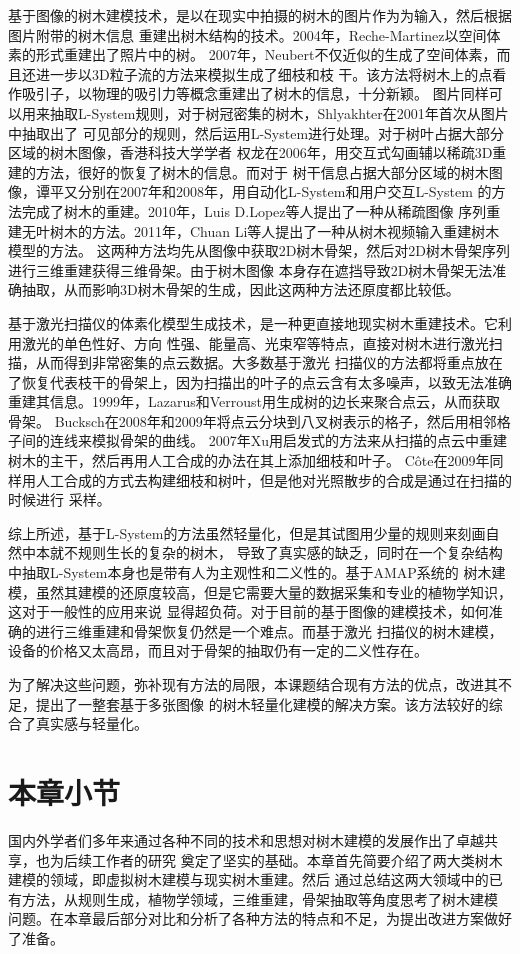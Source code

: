 基于图像的树木建模技术，是以在现实中拍摄的树木的图片作为为输入，然后根据图片附带的树木信息
重建出树木结构的技术。2004年，Reche-Martinez以空间体素的形式重建出了照片中的树\cite{reche}。
2007年，Neubert不仅近似的生成了空间体素，而且还进一步以3D粒子流的方法来模拟生成了细枝和枝
干\cite{neubert}。该方法将树木上的点看作吸引子，以物理的吸引力等概念重建出了树木的信息，十分新颖。
图片同样可以用来抽取L-System规则，对于树冠密集的树木，Shlyakhter在2001年首次从图片中抽取出了
可见部分的规则，然后运用L-System进行处理。对于树叶占据大部分区域的树木图像，香港科技大学学者
权龙在2006年，用交互式勾画辅以稀疏3D重建的方法，很好的恢复了树木的信息\cite{quanlong}。而对于
树干信息占据大部分区域的树木图像，谭平又分别在2007年和2008年，用自动化L-System和用户交互L-System
的方法完成了树木的重建\cite{tanping,tanping2}。2010年，Luis D.Lopez等人提出了一种从稀疏图像
序列重建无叶树木的方法。2011年，Chuan Li等人提出了一种从树木视频输入重建树木模型的方法\cite{lichuan}。
这两种方法均先从图像中获取2D树木骨架，然后对2D树木骨架序列进行三维重建获得三维骨架。由于树木图像
本身存在遮挡导致2D树木骨架无法准确抽取，从而影响3D树木骨架的生成，因此这两种方法还原度都比较低。

基于激光扫描仪的体素化模型生成技术，是一种更直接地现实树木重建技术。它利用激光的单色性好、方向
性强、能量高、光束窄等特点，直接对树木进行激光扫描，从而得到非常密集的点云数据。大多数基于激光
扫描仪的方法都将重点放在了恢复代表枝干的骨架上，因为扫描出的叶子的点云含有太多噪声，以致无法准确
重建其信息。1999年，Lazarus和Verroust用生成树的边长来聚合点云，从而获取骨架\cite{verroust}。
Bucksch在2008年和2009年将点云分块到八叉树表示的格子，然后用相邻格子间的连线来模拟骨架的曲线\cite{bucksch}。
2007年Xu用启发式的方法来从扫描的点云中重建树木的主干，然后再用人工合成的办法在其上添加细枝和叶子\cite{xu}。
C\^ote在2009年同样用人工合成的方式去构建细枝和树叶，但是他对光照散步的合成是通过在扫描的时候进行
采样\cite{cote}。

综上所述，基于L-System的方法虽然轻量化，但是其试图用少量的规则来刻画自然中本就不规则生长的复杂的树木，
导致了真实感的缺乏，同时在一个复杂结构中抽取L-System本身也是带有人为主观性和二义性的。基于AMAP系统的
树木建模，虽然其建模的还原度较高，但是它需要大量的数据采集和专业的植物学知识，这对于一般性的应用来说
显得超负荷。对于目前的基于图像的建模技术，如何准确的进行三维重建和骨架恢复仍然是一个难点。而基于激光
扫描仪的树木建模，设备的价格又太高昂，而且对于骨架的抽取仍有一定的二义性存在。

为了解决这些问题，弥补现有方法的局限，本课题结合现有方法的优点，改进其不足，提出了一整套基于多张图像
的树木轻量化建模的解决方案。该方法较好的综合了真实感与轻量化。

\section{本章小节}
国内外学者们多年来通过各种不同的技术和思想对树木建模的发展作出了卓越共享，也为后续工作者的研究
奠定了坚实的基础。本章首先简要介绍了两大类树木建模的领域，即虚拟树木建模与现实树木重建。然后
通过总结这两大领域中的已有方法，从规则生成，植物学领域，三维重建，骨架抽取等角度思考了树木建模
问题。在本章最后部分对比和分析了各种方法的特点和不足，为提出改进方案做好了准备。
